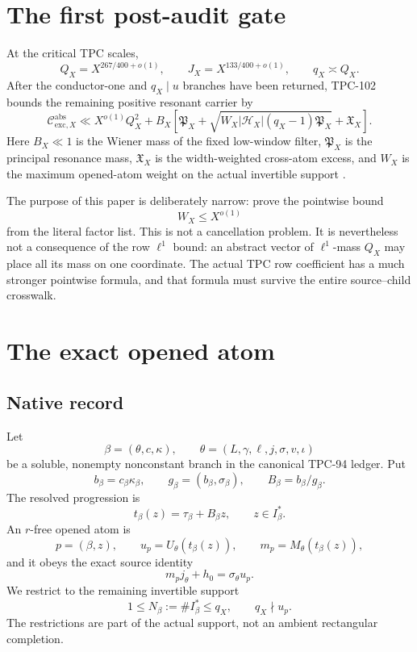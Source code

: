 \documentclass[11pt]{article}
\theoremstyle{definition}
\theoremstyle{remark}
\newcommand{\PX}{\mathfrak P_X}
\newcommand{\XX}{\mathfrak X_X}
\newcommand{\HX}{\mathcal H_X}
\begin{document}
\section{The first post-audit gate}
\label{sec:introduction}

At the critical TPC scales,
\[
 Q_X=X^{267/400+o(1)},\qquad
 J_X=X^{133/400+o(1)},\qquad q_X\asymp Q_X.
\]
After the conductor-one and \(q_X\mid u\) branches have been
returned, TPC-102 bounds the remaining positive resonant carrier by
\begin{equation}
 \mathcal C_{\mathrm{exc},X}^{\mathrm{abs}}
 \ll
 X^{o(1)}Q_X^2+
 B_X\left[
 \PX+
 \sqrt{W_X|\HX|(q_X-1)\PX}+\XX
 \right].
\label{eq:master}
\end{equation}
Here \(B_X\ll1\) is the Wiener mass of the fixed low-window filter,
\(\PX\) is the principal resonance mass, \(\XX\) is the
width-weighted cross-atom excess, and \(W_X\) is the maximum
opened-atom weight on the actual invertible support
\citep{WangTPC101,WangTPC102}.

The purpose of this paper is deliberately narrow: prove the
pointwise bound
\[
 W_X\le X^{o(1)}
\]
from the literal factor list.  This is not a cancellation problem.
It is nevertheless not a consequence of the row \(\ell^1\) bound:
an abstract vector of \(\ell^1\)-mass \(Q_X\) may place all its mass
on one coordinate.  The actual TPC row coefficient has a much
stronger pointwise formula, and that formula must survive the entire
source--child crosswalk.

\section{The exact opened atom}
\label{sec:atom}

\subsection{Native record}

Let
\[
 \beta=(\theta,c,\kappa),\qquad
 \theta=(L,\gamma,\ell,j,\sigma,v,\iota)
\]
be a soluble, nonempty nonconstant branch in the canonical
TPC-94 ledger.  Put
\[
 b_\beta=c_\beta\kappa_\beta,\qquad
 g_\beta=(b_\beta,\sigma_\beta),\qquad
 B_\beta=b_\beta/g_\beta.
\]
The resolved progression is
\[
 t_\beta(z)=\tau_\beta+B_\beta z,\qquad
 z\in I_\beta^\ast.
\]
An \(r\)-free opened atom is
\[
 p=(\beta,z),\qquad
 u_p=U_\theta(t_\beta(z)),\qquad
 m_p=M_\theta(t_\beta(z)),
\]
and it obeys the exact source identity
\begin{equation}
 m_pj_\theta+h_0=\sigma_\theta u_p.
\label{eq:source}
\end{equation}
We restrict to the remaining invertible support
\[
 1\le N_\beta:=\#I_\beta^\ast\le q_X,\qquad q_X\nmid u_p.
\]
The restrictions are part of the actual support, not an ambient
rectangular completion.
\end{document}
